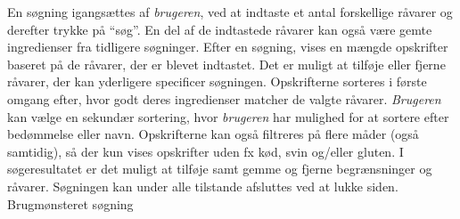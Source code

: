 {En søgning igangsættes af \textit{brugeren}, ved at indtaste et antal forskellige råvarer og derefter trykke på “søg”. En del af de indtastede råvarer kan også være gemte ingredienser fra tidligere søgninger. Efter en søgning, vises en mængde opskrifter baseret på de råvarer, der er blevet indtastet. Det er muligt at tilføje eller fjerne råvarer, der kan yderligere specificer søgningen.  Opskrifterne sorteres i første omgang efter, hvor godt deres ingredienser matcher de valgte råvarer. \textit{Brugeren} kan vælge en sekundær sortering, hvor \textit{brugeren} har mulighed for at sortere efter bedømmelse eller navn. Opskrifterne kan også filtreres på flere måder (også samtidig), så der kun vises opskrifter uden fx kød, svin og/eller gluten. I søgeresultatet er det muligt at tilføje samt gemme og fjerne begrænsninger og råvarer. Søgningen kan under alle tilstande afsluttes ved at lukke siden.}
{}
{}
{Brugmønsteret søgning}